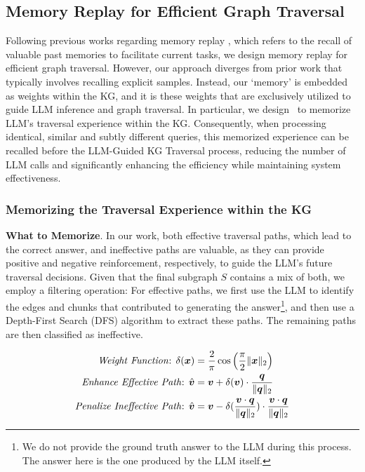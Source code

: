 \subsection{Memory Replay for Efficient Graph Traversal}
\label{sec::traversal-memorizing}
Following previous works regarding memory replay \cite{liu2018effects, wangmemory}, which refers to the recall of valuable past memories to facilitate current tasks, we design memory replay for efficient graph traversal. However, our approach diverges from prior work that typically involves recalling explicit samples. Instead, our `memory' is embedded as weights within the KG, and it is these weights that are exclusively utilized to guide LLM inference and graph traversal. In particular, we design \ours~to memorize LLM's traversal experience within the KG. Consequently, when processing identical, similar and subtly different queries, this memorized experience can be recalled before the LLM-Guided KG Traversal process, reducing the number of LLM calls and significantly enhancing the efficiency while maintaining system effectiveness.


\subsubsection{Memorizing the Traversal Experience within the KG}

\textbf{What to Memorize}. In our work, both effective traversal paths, which lead to the correct answer, and ineffective paths are valuable, as they can provide positive and negative reinforcement, respectively, to guide the LLM's future traversal decisions. Given that the final subgraph $S$ contains a mix of both, we employ a filtering operation: For effective paths, we first use the LLM to identify the edges and chunks that contributed to generating the answer\footnote{We do not provide the ground truth answer to the LLM during this process. The answer here is the one produced by the LLM itself.}, and then use a Depth-First Search (DFS) \cite{dfs} algorithm to extract these paths. The remaining paths are then classified as ineffective.

\begin{equation}
    \begin{aligned}
        \text{\textit{Weight Function}: } \delta(\bm{x}) &= \frac{2}{\pi}\cos\left(\frac{\pi}{2} \|\bm{x}\|_2\right) \\
        \text{\textit{Enhance Effective Path}: } \hat{\bm{v}} &= \bm{v} + \delta(\bm{v}) \cdot \frac{\bm{q}}{\|\bm{q}\|_2} \\
        \text{\textit{Penalize Ineffective Path}: } \hat{\bm{v}} &= \bm{v} - \delta(\frac{\bm{v} \cdot \bm{q}}{\|\bm{q}\|_2}) \cdot \frac{\bm{v} \cdot \bm{q}}{\|\bm{q}\|_2}
    \end{aligned}
\label{eq:update-function}
\end{equation}


